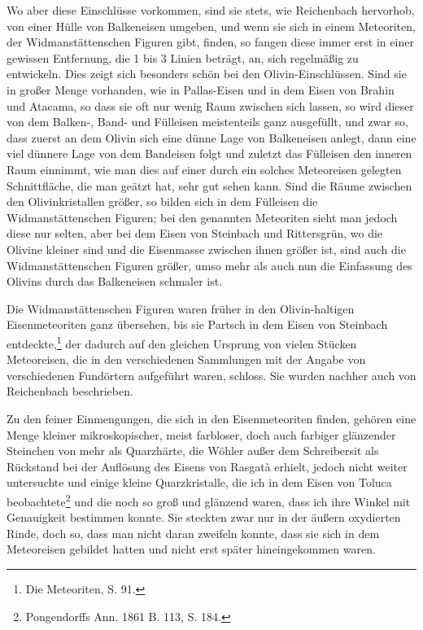 \documentclass[a4paper, 11pt, oneside]{article}
\begin{document}
Wo aber diese Einschlüsse vorkommen, sind sie stets, wie Reichenbach hervorhob, von einer Hülle von Balkeneisen umgeben, und wenn sie sich in einem Meteoriten, der Widmanstättenschen Figuren gibt, finden, so fangen diese immer erst in einer gewissen Entfernung, die 1 bis 3 Linien beträgt, an, sich regelmäßig zu entwickeln. Dies zeigt sich besonders schön bei den Olivin-Einschlüssen. Sind sie in großer Menge vorhanden, wie in Pallas-Eisen und in dem Eisen von Brahin und Atacama, so dass sie oft nur wenig Raum zwischen sich lassen, so wird dieser von dem Balken-, Band- und Fülleisen meistenteils ganz ausgefüllt, und zwar so, dass zuerst an dem Olivin sich eine dünne Lage von Balkeneisen anlegt, dann eine viel dünnere Lage von dem Bandeisen folgt und zuletzt das Fülleisen den inneren Raum einnimmt, wie man dies auf einer durch ein solches Meteoreisen gelegten Schnittfläche, die man geätzt hat, sehr gut sehen kann. Sind die Räume zwischen den Olivinkristallen größer, so bilden sich in dem Fülleisen die Widmanstättenschen Figuren; bei den genannten Meteoriten sieht man jedoch diese nur selten, aber bei dem Eisen von Steinbach und Rittersgrün, wo die Olivine kleiner sind und die Eisenmasse zwischen ihnen größer ist, sind auch die Widmanstättenschen Figuren größer, umso mehr als auch nun die Einfassung des Olivins durch das Balkeneisen schmaler ist.

Die Widmanstättenschen Figuren waren früher in den Olivin-haltigen Eisenmeteoriten ganz übersehen, bis sie Partsch in dem Eisen von Steinbach entdeckte,\footnote{Die Meteoriten, S. 91.} der dadurch auf den gleichen Ursprung von vielen Stücken Meteoreisen, die in den verschiedenen Sammlungen mit der Angabe von verschiedenen Fundörtern aufgeführt waren, schloss. Sie wurden nachher auch von Reichenbach beschrieben.

Zu den feiner Einmengungen, die sich in den Eisenmeteoriten finden, gehören eine Menge kleiner mikroskopischer, meist farbloser, doch auch farbiger glänzender Steinchen von mehr als Quarzhärte, die Wöhler außer dem Schreibersit als Rückstand bei der Auflösung des Eisens von Rasgatà erhielt, jedoch nicht weiter untersuchte und einige kleine Quarzkristalle, die ich in dem Eisen von Toluca beobachtete\footnote{Pongendorffs Ann. 1861 B. 113, S. 184.} und die noch so groß und glänzend waren, dass ich ihre Winkel mit Genauigkeit bestimmen konnte. Sie steckten zwar nur in der äußern oxydierten Rinde, doch so, dass man nicht daran zweifeln konnte, dass sie sich in dem Meteoreisen gebildet hatten und nicht erst später hineingekommen waren.
\end{document}
